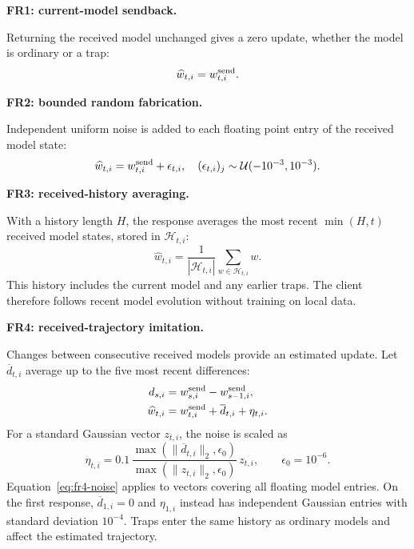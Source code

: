 \documentclass[journal]{IEEEtran}
\begin{document}
\par\medskip\noindent\textbf{FR1: current-model sendback.}\par\nopagebreak\smallskip\noindent
Returning the received model unchanged gives a zero update, whether the
model is ordinary or a trap:
\begin{equation}
 \widehat w_{t,i}=w^{\rm send}_{t,i}.
\end{equation}

\par\medskip\noindent\textbf{FR2: bounded random fabrication.}\par\nopagebreak\smallskip\noindent
Independent uniform noise is added to each floating point entry of the
received model state:
\begin{equation}
 \widehat w_{t,i}=w^{\rm send}_{t,i}+\epsilon_{t,i},\quad
 (\epsilon_{t,i})_j\sim\mathcal U(-10^{-3},10^{-3}).
\end{equation}

\par\medskip\noindent\textbf{FR3: received-history averaging.}\par\nopagebreak\smallskip\noindent
With a history length $H$, the response averages the most recent
$\min(H,t)$ received model states, stored in $\mathcal H_{t,i}$:
\begin{equation}
 \widehat w_{t,i}=\frac{1}{|\mathcal H_{t,i}|}
       \sum_{w\in\mathcal H_{t,i}}w.
\end{equation}
This history includes the current model and any earlier traps. The client
therefore follows recent model evolution without training on local data.

\par\medskip\noindent\textbf{FR4: received-trajectory imitation.}\par\nopagebreak\smallskip\noindent
Changes between consecutive received models provide an estimated update.
Let $\overline d_{t,i}$ average up to the five most recent differences:
\begin{align}
 d_{s,i}&=w^{\rm send}_{s,i}-w^{\rm send}_{s-1,i},\\
 \widehat w_{t,i}&=w^{\rm send}_{t,i}+\overline d_{t,i}+\eta_{t,i}.
\end{align}
For a standard Gaussian vector $z_{t,i}$, the noise is scaled as
\begin{equation}\label{eq:fr4-noise}
 \eta_{t,i}=0.1\,
 \frac{\max(\|\overline d_{t,i}\|_2,\epsilon_0)}
      {\max(\|z_{t,i}\|_2,\epsilon_0)}\,z_{t,i},
 \qquad\epsilon_0=10^{-6}.
\end{equation}
Equation~\eqref{eq:fr4-noise} applies to vectors covering all floating
model entries. On the first response,
$\overline d_{1,i}=0$ and $\eta_{1,i}$ instead has independent Gaussian entries with
standard deviation $10^{-4}$. Traps enter the same history as ordinary
models and affect the estimated trajectory.
\end{document}

